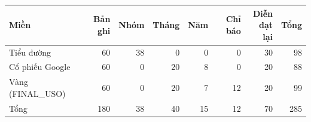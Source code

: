 \begin{tabular}{lrrrrrrr}
\toprule
Miền & Bản ghi & Nhóm & Tháng & Năm & Chỉ báo & \makecell[r]{Diễn\\đạt lại} & Tổng \\
\midrule
Tiểu đường & 60 & 38 & 0 & 0 & 0 & 30 & 98 \\
Cổ phiếu Google & 60 & 0 & 20 & 8 & 0 & 20 & 88 \\
Vàng (FINAL\_USO) & 60 & 0 & 20 & 7 & 12 & 20 & 99 \\
Tổng & 180 & 38 & 40 & 15 & 12 & 70 & 285 \\
\bottomrule
\end{tabular}

